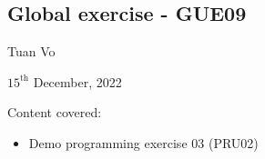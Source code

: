 \documentclass[12pt]{article}
\begin{document}
\begin{center}
	\section*{Global exercise - GUE09}
\end{center}
\begin{center}
	Tuan Vo
\end{center}
\begin{center}
	$15^{\text{th}}$ December, 2022
\end{center}
Content covered:
\begin{itemize}
	\item[\checkmark] Demo programming exercise 03 (PRU02)
\end{itemize}
\end{document}
